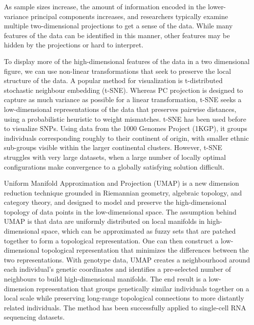 \documentclass[12pt]{pnas-new}
\begin{document}
As sample sizes increase, the amount of information encoded in the lower-variance principal components increases, and researchers typically examine multiple two-dimensional projections to get a sense of the data. While many features of the data can be identified in this manner, other features may be hidden by the projections or hard to interpret.     

To display more of the high-dimensional features of the data in a two dimensional figure,  we can use non-linear transformations that seek to preserve the local structure of the data. A popular method for visualization is t-distributed stochastic neighbour embedding (t-SNE)\cite{maaten2008visualizing}. Whereas PC projection is designed to capture as much variance as possible for a linear transformation, t-SNE seeks a low-dimensional representations of the data that preserves pairwise distances, using a probabilistic heuristic to weight mismatches. t-SNE has been used before to visualize SNPs\cite{platzer2013visualization}. Using data from the 1000 Genomes Project (1KGP)\cite{10002015global}, it groups individuals corresponding roughly to their continent of origin, with smaller ethnic sub-groups visible within the larger continental clusters\cite{li2017tsne}. However, t-SNE struggles with very large datasets, when a large number of locally optimal configurations make convergence to a globally satisfying solution difficult. 

Uniform Manifold Approximation and Projection (UMAP) is a new dimension reduction technique grounded in Riemannian geometry, algebraic topology, and category theory, and designed to model and preserve the high-dimensional topology of data points in the low-dimensional space\cite{2018arXivUMAP}. The assumption behind UMAP is that data are uniformly distributed on local manifolds in high-dimensional space, which can be approximated as fuzzy sets that are patched together to form a topological representation. One can then construct a low-dimensional topological representation that minimizes the differences between the two representations. With genotype data, UMAP creates a neighbourhood around each individual's genetic coordinates and identifies a pre-selected number of neighbours to build high-dimensional manifolds. The end result is a low-dimension representation that groups genetically similar individuals together on a local scale while preserving long-range topological connections to more distantly related individuals. The method has been successfully applied to single-cell RNA sequencing datasets\cite{umap2018singlecell}.
\end{document}
